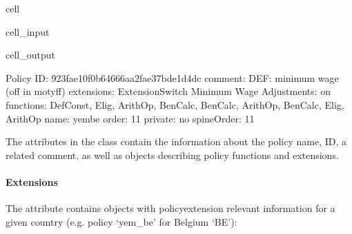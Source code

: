 \documentclass[letterpaper,10pt,english]{sphinxmanual}
\begin{document}
\begin{sphinxuseclass}{cell}
\begin{sphinxuseclass}{cell_input}
\begin{sphinxVerbatim}[commandchars=\\\{\}]
\PYG{p}{[}\PYG{p}{]}\PYG{p}{[}\PYG{p}{]}
\end{sphinxVerbatim}

\end{sphinxuseclass}
\begin{sphinxuseclass}{cell_output}
\begin{sphinxVerbatim}[commandchars=\\\{\}]
\PYGZhy{}\PYGZhy{}\PYGZhy{}\PYGZhy{}\PYGZhy{}\PYGZhy{}\PYGZhy{}\PYGZhy{}\PYGZhy{}\PYGZhy{}\PYGZhy{}\PYGZhy{}\PYGZhy{}\PYGZhy{}\PYGZhy{}\PYGZhy{}\PYGZhy{}\PYGZhy{}\PYGZhy{}\PYGZhy{}\PYGZhy{}\PYGZhy{}\PYGZhy{}\PYGZhy{}\PYGZhy{}\PYGZhy{}\PYGZhy{}\PYGZhy{}\PYGZhy{}\PYGZhy{}
Policy
\PYGZhy{}\PYGZhy{}\PYGZhy{}\PYGZhy{}\PYGZhy{}\PYGZhy{}\PYGZhy{}\PYGZhy{}\PYGZhy{}\PYGZhy{}\PYGZhy{}\PYGZhy{}\PYGZhy{}\PYGZhy{}\PYGZhy{}\PYGZhy{}\PYGZhy{}\PYGZhy{}\PYGZhy{}\PYGZhy{}\PYGZhy{}\PYGZhy{}\PYGZhy{}\PYGZhy{}\PYGZhy{}\PYGZhy{}\PYGZhy{}\PYGZhy{}\PYGZhy{}\PYGZhy{}
	 ID: \PYGZsq{}923fae10\PYGZhy{}f0b6\PYGZhy{}4666\PYGZhy{}aa2f\PYGZhy{}ae37bde1d4dc\PYGZsq{}
	 comment: \PYGZsq{}DEF: minimum wage  (off in motyff)\PYGZsq{}
	 extensions: ExtensionSwitch Minimum Wage Adjustments: on
	 functions: DefConst, Elig, ArithOp, BenCalc, BenCalc, ArithOp, BenCalc, Elig, ArithOp
	 name: \PYGZsq{}yem\PYGZus{}be\PYGZsq{}
	 order: \PYGZsq{}11\PYGZsq{}
	 private: \PYGZsq{}no\PYGZsq{}
	 spineOrder: \PYGZsq{}11\PYGZsq{}
\end{sphinxVerbatim}

\end{sphinxuseclass}
\end{sphinxuseclass}
\sphinxAtStartPar
The attributes in the  class contain the information about the policy name, ID, a related comment, as well as objects describing policy functions and extensions.


\paragraph{Extensions}
\label{\detokenize{userguide:id1}}
\sphinxAtStartPar
The attribute  contains  objects with policy\sphinxhyphen{}extension relevant information for a given country (e.g. policy ‘yem\_be’ for Belgium ‘BE’):
\end{document}
